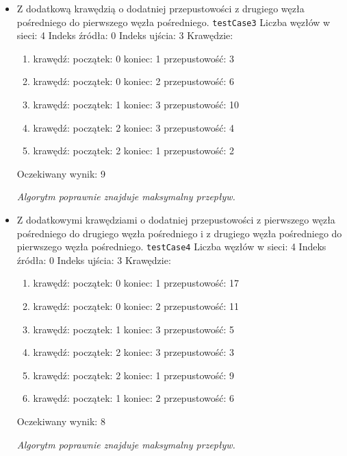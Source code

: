 \begin{itemize}[nosep]
    \item Z dodatkową krawędzią o dodatniej przepustowości z drugiego węzła
    pośredniego do pierwszego węzła pośredniego.
    \texttt{testCase3}
    Liczba węzłów w sieci: 4
    Indeks źródła: 0
    Indeks ujścia: 3
    Krawędzie:
    \begin{enumerate}[nosep]
        \item krawędź:
        początek: 0
        koniec: 1
        przepustowość: 3
        \item krawędź:
        początek: 0
        koniec: 2
        przepustowość: 6
        \item krawędź:
        początek: 1
        koniec: 3
        przepustowość: 10
        \item krawędź:
        początek: 2
        koniec: 3
        przepustowość: 4
        \item krawędź:
        początek: 2
        koniec: 1
        przepustowość: 2
    \end{enumerate}
    Oczekiwany wynik: 9

    \emph{Algorytm poprawnie znajduje maksymalny przepływ.}

    \item Z dodatkowymi krawędziami o dodatniej przepustowości z pierwszego
    węzła pośredniego do drugiego węzła pośredniego i z drugiego węzła
    pośredniego do pierwszego węzła pośredniego.
    \texttt{testCase4}
    Liczba węzłów w sieci: 4
    Indeks źródła: 0
    Indeks ujścia: 3
    Krawędzie:
    \begin{enumerate}[nosep]
        \item krawędź:
        początek: 0
        koniec: 1
        przepustowość: 17
        \item krawędź:
        początek: 0
        koniec: 2
        przepustowość: 11
        \item krawędź:
        początek: 1
        koniec: 3
        przepustowość: 5
        \item krawędź:
        początek: 2
        koniec: 3
        przepustowość: 3
        \item krawędź:
        początek: 2
        koniec: 1
        przepustowość: 9
        \item krawędź:
        początek: 1
        koniec: 2
        przepustowość: 6
    \end{enumerate}
    Oczekiwany wynik: 8

    \emph{Algorytm poprawnie znajduje maksymalny przepływ.}


\end{itemize}
